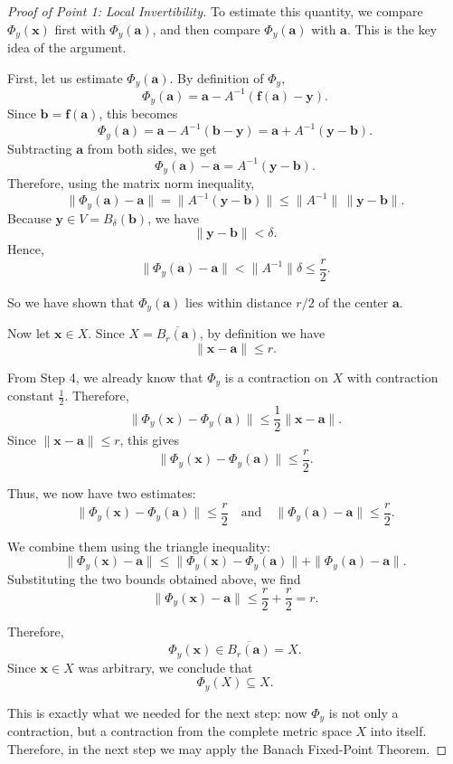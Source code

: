 \documentclass{article}
\begin{document}
\begin{proof}[Proof of Point 1: Local Invertibility]
To estimate this quantity, we compare $\Phi_y(\mathbf{x})$ first with $\Phi_y(\mathbf{a})$, and then compare $\Phi_y(\mathbf{a})$ with $\mathbf{a}$. This is the key idea of the argument.

First, let us estimate $\Phi_y(\mathbf{a})$. By definition of $\Phi_y$,
\[
\Phi_y(\mathbf{a})
=
\mathbf{a}-A^{-1}(\mathbf{f}(\mathbf{a})-\mathbf{y}).
\]
Since $\mathbf{b}=\mathbf{f}(\mathbf{a})$, this becomes
\[
\Phi_y(\mathbf{a})
=
\mathbf{a}-A^{-1}(\mathbf{b}-\mathbf{y})
=
\mathbf{a}+A^{-1}(\mathbf{y}-\mathbf{b}).
\]
Subtracting $\mathbf{a}$ from both sides, we get
\[
\Phi_y(\mathbf{a})-\mathbf{a}=A^{-1}(\mathbf{y}-\mathbf{b}).
\]
Therefore, using the matrix norm inequality,
\[
\|\Phi_y(\mathbf{a})-\mathbf{a}\|
=
\|A^{-1}(\mathbf{y}-\mathbf{b})\|
\le
\|A^{-1}\|\,\|\mathbf{y}-\mathbf{b}\|.
\]
Because $\mathbf{y}\in V=B_\delta(\mathbf{b})$, we have
\[
\|\mathbf{y}-\mathbf{b}\|<\delta.
\]
Hence,
\[
\|\Phi_y(\mathbf{a})-\mathbf{a}\|
<
\|A^{-1}\|\delta
\le
\frac r2.
\]

So we have shown that $\Phi_y(\mathbf{a})$ lies within distance $r/2$ of the center $\mathbf{a}$.

Now let $\mathbf{x}\in X$. Since $X=\overline{B_r(\mathbf{a})}$, by definition we have
\[
\|\mathbf{x}-\mathbf{a}\|\le r.
\]

From Step 4, we already know that $\Phi_y$ is a contraction on $X$ with contraction constant $\frac12$. Therefore,
\[
\|\Phi_y(\mathbf{x})-\Phi_y(\mathbf{a})\|
\le
\frac12\|\mathbf{x}-\mathbf{a}\|.
\]
Since $\|\mathbf{x}-\mathbf{a}\|\le r$, this gives
\[
\|\Phi_y(\mathbf{x})-\Phi_y(\mathbf{a})\|
\le
\frac r2.
\]

Thus, we now have two estimates:
\[
\|\Phi_y(\mathbf{x})-\Phi_y(\mathbf{a})\|\le \frac r2
\quad\text{and}\quad
\|\Phi_y(\mathbf{a})-\mathbf{a}\|\le \frac r2.
\]

We combine them using the triangle inequality:
\[
\|\Phi_y(\mathbf{x})-\mathbf{a}\|
\le
\|\Phi_y(\mathbf{x})-\Phi_y(\mathbf{a})\|
+
\|\Phi_y(\mathbf{a})-\mathbf{a}\|.
\]
Substituting the two bounds obtained above, we find
\[
\|\Phi_y(\mathbf{x})-\mathbf{a}\|
\le
\frac r2+\frac r2
=
r.
\]

Therefore,
\[
\Phi_y(\mathbf{x})\in \overline{B_r(\mathbf{a})}=X.
\]
Since $\mathbf{x}\in X$ was arbitrary, we conclude that
\[
\Phi_y(X)\subseteq X.
\]

This is exactly what we needed for the next step: now $\Phi_y$ is not only a contraction, but a contraction from the complete metric space $X$ into itself. Therefore, in the next step we may apply the Banach Fixed-Point Theorem.


\end{proof}
\end{document}
